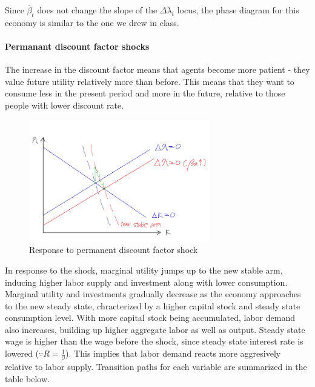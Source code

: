 \documentclass[11pt]{amsart}
\begin{document}
Since $\check{\beta_t}$ does not change the slope of the $\Delta \lambda_t$ locus, the phase diagram for this economy is similar to the one we drew in class. 

\paragraph{ \bf Permanant discount factor shocks}
The increase in the discount factor means that agents become more patient - they value future utility relatively more than before. This means that they want to consume less in the present period and more in the future, relative to those people with lower discount rate. 
\begin{figure}[H]
	\centering
	\includegraphics[width=0.7\textwidth]{2_1_Minki.png}
	\caption{Response to permanent discount factor shock}
\end{figure}
In response to the shock, marginal utility jumps up to the new stable arm, inducing higher labor supply and investment along with lower consumption. Marginal utility and investments gradually decrease as the economy approaches to the new steady state, chracterized by a higher capital stock and steady state consumption level. With more capital stock being accumulated, labor demand also increases, building up higher aggregate labor as well as output. Steady state wage is higher than the wage before the shock, since steady state interest rate is lowered ($\because R = \frac{1}{\beta}$). This implies that labor demand reacts more aggresively relative to labor supply. Transition paths for each variable are summarized in the table below. 
\end{document}
